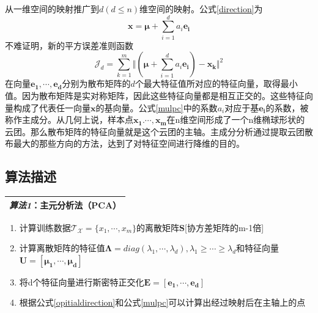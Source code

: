 \documentclass[12pt,a4paper,CJK]{beamer}
\begin{document}
\begin{CJK*}{UTF8}{gkai}
\begin{frame}{\subsecname}
从一维空间的映射推广到$d(d\leqslant{}n)$维空间的映射。公式\ref{direction}为
\begin{equation}
\label{mulpc}
\boldsymbol{x}=\boldsymbol{\mu}+\sum_{i=1}^{d}a_i\boldsymbol{e_i}
\end{equation}
不难证明，新的平方误差准则函数
\begin{equation}
\label{mulms}
\mathcal{J}_{d}=\sum_{k=1}^{m}\Vert(\boldsymbol{\mu}+\sum_{i=1}^{d}a_i\boldsymbol{e_i})-\boldsymbol{x_k}\Vert^2   
\end{equation}
在向量$\boldsymbol{e_1},\cdots,\boldsymbol{e_{d}}$分别为散布矩阵的$d$个最大特征值所对应的特征向量，取得最小值。因为散布矩阵是实对称矩阵，因此这些特征向量都是相互正交的。这些特征向量构成了代表任一向量$\boldsymbol{x}$的基向量。公式\ref{mulpc}中的系数$a_i$对应于基$\boldsymbol{e_i}$的系数，被称作主成分。从几何上说，样本点$\boldsymbol{x_1}.\cdots,\boldsymbol{x_m}$在n维空间形成了一个n维椭球形状的云团。那么散布矩阵的特征向量就是这个云团的主轴。主成分分析通过提取云团散布最大的那些方向的方法，达到了对特征空间进行降维的目的。
\end{frame}

\subsection{算法描述}
\begin{frame}{\subsecname}
\begin{table}[!htp]
\label{notation}
\center
\begin{tabular}{|L{0.9\textwidth}|}
\hline
\textit{算法1}：主元分析法（PCA） \\
\hline
\end{tabular}
\end{table}
\begin{enumerate}
\item 计算训练数据$\mathcal{T_X}=\{x_1,\cdots,x_m\}$的离散矩阵$\mathbf{S}$[协方差矩阵的m-1倍]
\item 计算离散矩阵的特征值$\mathbf{\Lambda}=diag(\lambda_1,\cdots,\lambda_d),\lambda_1\geqslant\cdots\geqslant\lambda_d$和特征向量$\mathbf{U}=[\boldsymbol{\mu_1},\cdots,\boldsymbol{\mu_{d}}]$
\item 将d个特征向量进行斯密特正交化$\mathbf{E}=[\boldsymbol{e_1},\cdots,\boldsymbol{e_{d}}]$
\item 根据公式\ref{opitialdirection}和公式\ref{mulpc}可以计算出经过映射后在主轴上的点
\end{enumerate}


\end{frame}
\end{CJK*}
\end{document}
